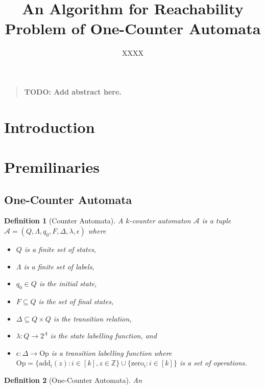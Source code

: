\documentclass[12pt]{article}
\title{An Algorithm for Reachability Problem of One-Counter Automata}
\author
{XXXX
}
\date{}
\newtheorem{definition}{Definition}
\newenvironment{sciabstract}{%
\begin{quote} \bf}
{\end{quote}}
\begin{document}
 


\baselineskip24pt


\maketitle 




\begin{sciabstract}
TODO: Add abstract here.
\end{sciabstract}

\section{Introduction}

\section{Premilinaries}
\subsection{One-Counter Automata}

\begin{definition}[Counter Automata]
A $k$-counter automaton $\mathcal{A}$ is a tuple $\mathcal{A} = (Q, \Lambda, q_0, F, \Delta, \lambda, \epsilon)$ where
\begin{itemize}
\item $Q$ is a finite set of states,
\item $\Lambda$ is a finite set of labels,
\item $q_0\in Q$ is the initial state,
\item $F\subseteq Q$ is the set of final states,
\item $\Delta\subseteq Q\times Q$ is the transition relation,
\item $\lambda:Q\rightarrow 2^\Lambda$ is the state labelling function, and
\item $\epsilon:\Delta\rightarrow \text{Op}$ is a transition labelling function where $\text{Op} = \{\text{add}_i(z) : i\in [k], z\in \mathbb{Z}\} \cup \{\text{zero}_i:i\in [k]\}$ is a set of operations.
\end{itemize}

\end{definition}
\begin{definition}[One-Counter Automata]
An 


\end{definition}
\end{document}
